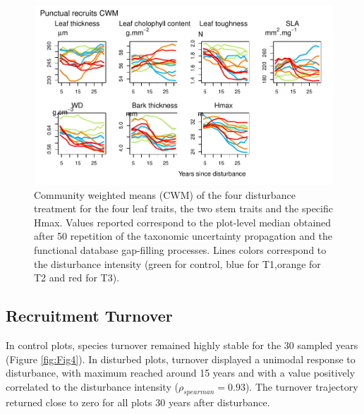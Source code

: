 \documentclass[fleqn,10pt]{ArtEcoFoG} %
\begin{document}
\begin{figure}

{\centering \includegraphics[width=0.8\linewidth]{RecruitmentTrajectories_files/figure-latex/Fig3-1} 

}

\caption{Community weighted means (CWM) of the four disturbance treatment for the four leaf traits, the two stem traits  and the specific Hmax. Values reported correspond to the plot-level median obtained after 50 repetition of the taxonomic uncertainty propagation and the functional database gap-filling processes. Lines colors correspond to the disturbance intensity (green for control, blue for T1,orange for T2 and red for T3).}\label{fig:Fig3}
\end{figure}

\subsection{Recruitment Turnover}\label{recruitment-turnover}

In control plots, species turnover remained highly stable for the 30
sampled years (Figure \ref{fig:Fig4}). In disturbed plots, turnover
displayed a unimodal response to disturbance, with maximum reached
around 15 years and with a value positively correlated to the
disturbance intensity (\(\rho_{spearman}=0.93\)). The turnover
trajectory returned close to zero for all plots 30 years after
disturbance.
\end{document}
